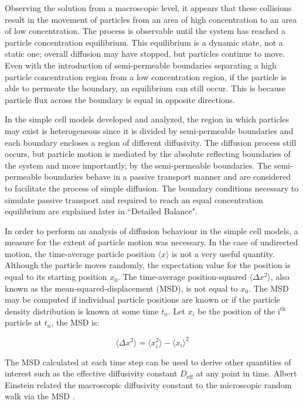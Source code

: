 	\newpage
	Observing the solution from a macroscopic level, it appears that these collisions result in the movement of particles from an area of high concentration to an area of low concentration. The process is observable until the system has reached a particle concentration equilibrium. This equilibrium is a dynamic state, not a static one; overall diffusion may have stopped, but particles continue to move.	Even with the introduction of semi-permeable boundaries separating a high particle concentration region from a low concentration region, if the particle is able to permeate the boundary, an equilibrium can still occur. This is because particle flux across the boundary is equal in opposite directions.
	
	In the simple cell models developed and analyzed, the region in which particles may exist is heterogeneous since it is divided by semi-permeable boundaries and each boundary encloses a region of different diffusivity. The diffusion process still occurs, but particle motion is mediated by the absolute reflecting boundaries of the system and more importantly, by the semi-permeable boundaries. The semi-permeable boundaries behave in a passive transport manner and are considered to facilitate the process of simple diffusion. The boundary conditions necessary to simulate passive transport and required to reach an equal concentration equilibrium are explained later in ``Detailed Balance".
	
	In order to perform an analysis of diffusion behaviour in the simple cell models, a measure for the extent of particle motion was necessary. In the case of undirected motion, the time-average particle position $ \langle x \rangle $ is not a very useful quantity. Although the particle moves randomly, the expectation value for the position is equal to its starting position $ x_0 $. The time-average position-squared $ \langle \Delta x^2 \rangle $, also known as the mean-squared-displacement (MSD), is not equal to $ x_0 $. The MSD may be computed if individual particle positions are known or if the particle density distribution is known at some time $ t_n $. Let $ x_i $ be the position of the $ \textrm{i}^\textrm{th} $ particle at $ t_n $, the MSD is:
		
	\begin{equation}
		\langle \Delta x^2 \rangle = \langle x_{i}^2 \rangle - \langle x_i \rangle^2
	\end{equation}
	
	The MSD calculated at each time step can be used to derive other quantities of interest such as the effective diffusivity constant $ D_\textrm{eff} $ at any point in time. Albert Einstein related the macroscopic diffusivity constant to the microscopic random walk via the MSD \citep{diffusion-1}.
	
